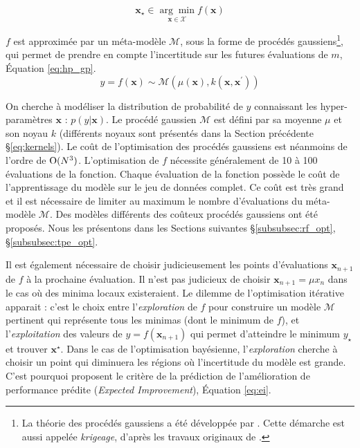 \begin{equation} \label{eq:hp_optimization}
\boldsymbol{x}_{\star} \in \underset{\boldsymbol{x} \in \mathcal{X}}{\arg \min } f(\boldsymbol{x})
\end{equation}

$f$ est approximée par un méta-modèle $\mathcal{M}$, sous la forme de procédés gaussiens\footnote{La théorie des procédés gaussiens a été développée par \citeauthor{matheron_principles_1963} \cite{matheron_principles_1963}. Cette démarche est aussi appelée \textit{krigeage}, d'après les travaux originaux de \citeauthor{krige_statistical_1951} \cite{krige_statistical_1951}.}, qui permet de prendre en compte l'incertitude sur les futures évaluations de $m$, Équation \ref{eq:hp_gp}.
\begin{equation} \label{eq:hp_gp}
y = f(\boldsymbol{x}) \sim \mathcal{M}\left(\mu(\boldsymbol{x}), k\left(\boldsymbol{x}, \boldsymbol{x}^{\prime}\right)\right)
\end{equation}

On cherche à modéliser la distribution de probabilité de $y$ connaissant les hyper-paramètres $\boldsymbol{x}$ : $p(y | \boldsymbol{x})$.
Le procédé gaussien $\mathcal{M}$ est défini par sa moyenne $\mu$ et son noyau $k$ (différents noyaux sont présentés dans la Section précédente §\ref{eq:kernels}).
Le coût de l'optimisation des procédés gaussiens est néanmoins de l'ordre de $\operatorname{O}(N^3)$.
L'optimisation de $f$ nécessite généralement de 10 à 100 évaluations de la fonction.
Chaque évaluation de la fonction possède le coût de l'apprentissage du modèle sur le jeu de données complet.
Ce coût est très grand et il est nécessaire de limiter au maximum le nombre d'évaluations du méta-modèle $\mathcal{M}$.
Des modèles différents des coûteux procédés gaussiens ont été proposés.
Nous les présentons dans les Sections suivantes §\ref{subsubsec:rf_opt}, §\ref{subsubsec:tpe_opt}.

Il est également nécessaire de choisir judicieusement les points d'évaluations $\boldsymbol{x}_{n+1}$ de $f$ à la prochaine évaluation.
Il n'est pas judicieux de choisir $\boldsymbol{x}_{n+1} = \mu{x_{n}}$ dans le cas où des minima locaux existeraient.
Le dilemme de l'optimisation itérative apparait : c'est le choix entre l'\textit{exploration} de $f$ pour construire un modèle $\mathcal{M}$ pertinent qui représente tous les minimas (dont le minimum de $f$), et l'\textit{exploitation} des valeurs de $y = f(\boldsymbol{x}_{n+1})$ qui permet d'atteindre le minimum $y_{\star}$ et trouver $\boldsymbol{x}^{\star}$.
Dans le cas de l'optimisation bayésienne, l'\textit{exploration} cherche à choisir un point qui diminuera les régions où l'incertitude du modèle est grande.
C'est pourquoi \citeauthor{jones_efficient_1998} \cite{jones_efficient_1998} proposent le critère de la prédiction de l'amélioration de performance prédite (\textit{Expected Improvement}), Équation \ref{eq:ei}.

